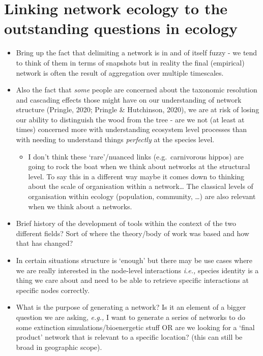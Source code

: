 \documentclass[
]{article}
\providecommand{\tightlist}{%
  \setlength{\itemsep}{0pt}\setlength{\parskip}{0pt}}\usepackage{longtable,booktabs,array}
\begin{document}
\section{Linking network ecology to the outstanding questions in
ecology}\label{linking-network-ecology-to-the-outstanding-questions-in-ecology}

\begin{itemize}
\item
  Bring up the fact that delimiting a network is in and of itself fuzzy
  - we tend to think of them in terms of snapshots but in reality the
  final (empirical) network is often the result of aggregation over
  multiple timescales.
\item
  Also the fact that \emph{some} people are concerned about the
  taxonomic resolution and cascading effects those might have on our
  understanding of network structure (Pringle, 2020; Pringle \&
  Hutchinson, 2020), we are at risk of losing our ability to distinguish
  the wood from the tree - are we not (at least at times) concerned more
  with understanding ecosystem level processes than with needing to
  understand things \emph{perfectly} at the species level.

  \begin{itemize}
  \tightlist
  \item
    I don't think these `rare'/nuanced links (e.g.~carnivorous hippos)
    are going to rock the boat when we think about networks at the
    structural level. To say this in a different way maybe it comes down
    to thinking about the scale of organisation within a network\ldots{}
    The classical levels of organisation within ecology (population,
    community, \ldots) are also relevant when we think about a networks.
  \end{itemize}
\item
  Brief history of the development of tools within the context of the
  two different fields? Sort of where the theory/body of work was based
  and how that has changed?
\item
  In certain situations structure is `enough' but there may be use cases
  where we are really interested in the node-level interactions
  \emph{i.e.,} species identity is a thing we care about and need to be
  able to retrieve specific interactions at specific nodes correctly.
\item
  What is the purpose of generating a network? Is it an element of a
  bigger question we are asking, \emph{e.g.,} I want to generate a
  series of networks to do some extinction simulations/bioenergetic
  stuff OR are we looking for a `final product' network that is relevant
  to a specific location? (this can still be broad in geographic scope).
\end{itemize}
\end{document}
